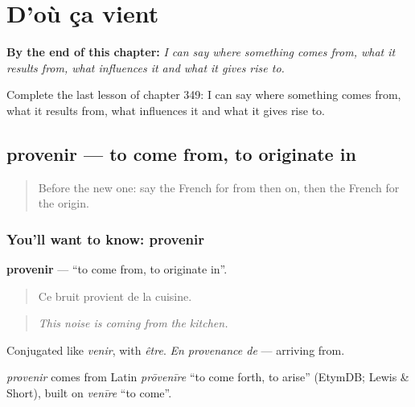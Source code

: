 
\chapter{D'où ça vient}
\label{ch:fr-d-ou-ca-vient}

\begin{chapteropening}
\textbf{By the end of this chapter:} \emph{I can say where something comes from, what it results from, what influences it and what it gives rise to.}

Complete the last lesson of chapter 349: I can say where something comes from, what it results from, what influences it and what it gives rise to.
\end{chapteropening}

\section[provenir]{provenir — to come from, to originate in}

\label{lesson:FR-C349-provenir}



\begin{quote}
Before the new one: say the French for from then on, then the French for the origin.
\end{quote}

\subsection*{You'll want to know: provenir}
\textbf{provenir} — \textquotedblleft{}to come from, to originate in\textquotedblright{}.

\begin{quote}
Ce bruit provient de la cuisine.
\end{quote}

\begin{quote}
\emph{This noise is coming from the kitchen.}
\end{quote}

Conjugated like \emph{venir}, with \emph{être}. \emph{En provenance de} — arriving from.

\begin{cousinweb}
\emph{provenir} comes from Latin \emph{prōvenīre} \textquotedblleft{}to come forth, to arise\textquotedblright{} (EtymDB; Lewis \& Short), built on \emph{venīre} \textquotedblleft{}to come\textquotedblright{}.
\end{cousinweb}

